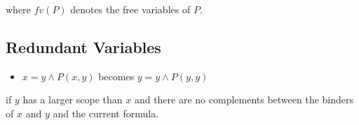 where $fv(P)$ denotes the free variables of $P$.

\subsection{Redundant Variables}

\begin{itemize}
    \item $x = y \land P(x, y)$ becomes $y = y \land P(y, y)$
\end{itemize}

if $y$ has a larger scope than $x$ and there are no complements between the binders of $x$ and $y$ and 
the current formula.
